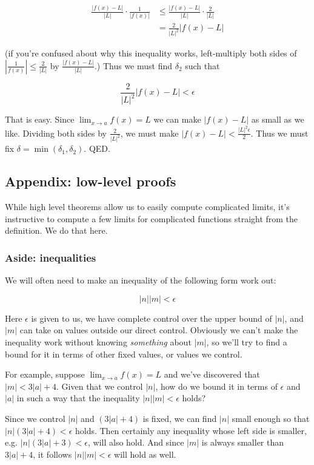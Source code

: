 \begin{align*}
  \frac{|f(x)-L|}{|L|}\cdot\frac{1}{|f(x)|}&\leq\frac{|f(x)-L|}{|L|}\cdot\frac{2}{|L|}\\
                                       &=\frac{2}{|L|^2}|f(x)-L|
\end{align*}

(if you're confused about why this inequality works, left-multiply both sides of
$|\frac{1}{f(x)}|\leq \frac{2}{|L|}$ by $\frac{|f(x)-L|}{|L|}$.) Thus we
must find $\delta_2$ such that

\[\frac{2}{|L|^2}|f(x)-L|<\epsilon\]

That is easy. Since $\lim_{x\to a}f(x)=L$ we can make $|f(x)-L|$ as
small as we like. Dividing both sides by $\frac{2}{|L|^2}$, we must
make $|f(x)-L|<\frac{|L|^2\epsilon}{2}$. Thus we must fix
$\delta=\min(\delta_1, \delta_2)$. QED.

\subsection{Appendix: low-level proofs}

While high level theorems allow us to easily compute complicated
limits, it's instructive to compute a few limits for complicated
functions straight from the definition. We do that here.

\subsubsection*{Aside: inequalities}

We will often need to make an inequality of the following form work out:

\[|n||m|<\epsilon\]

Here $\epsilon$ is given to us, we have complete control over the upper bound
of $|n|$, and $|m|$ can take on values outside our direct control.
Obviously we can't make the inequality work without knowing
\textit{something} about $|m|$, so we'll try to find a bound for it in
terms of other fixed values, or values we control.

\vs

For example, suppose $\lim_{x\to a}f(x)=L$ and we've discovered that
$|m|<3|a|+4$. Given that we control $|n|$, how do we bound it in terms
of $\epsilon$ and $|a|$ in such a way that the inequality $|n||m|<\epsilon$ holds?

\vs

Since we control $|n|$ and $(3|a|+4)$ is fixed, we can find $|n|$
small enough so that $|n|(3|a|+4)<\epsilon$ holds. Then certainly any
inequality whose left side is smaller, e.g. $|n|(3|a|+3)<\epsilon$, will also
hold. And since $|m|$ is always smaller than $3|a|+4$, it follows
$|n||m|<\epsilon$ will hold as well.

